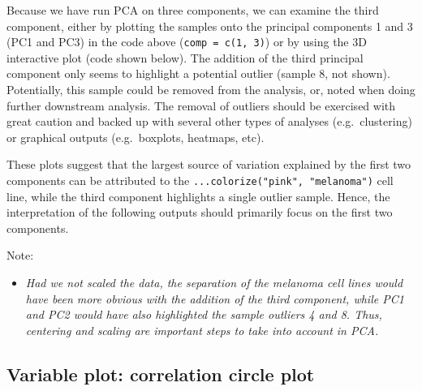 \documentclass[
]{book}
\newenvironment{Shaded}{\begin{snugshade}}{\end{snugshade}}
\newcommand{\AttributeTok}[1]{\textcolor[rgb]{0.77,0.63,0.00}{#1}}
\newcommand{\CommentTok}[1]{\textcolor[rgb]{0.56,0.35,0.01}{\textit{#1}}}
\newcommand{\FunctionTok}[1]{\textcolor[rgb]{0.00,0.00,0.00}{#1}}
\newcommand{\NormalTok}[1]{#1}
\newcommand{\SpecialCharTok}[1]{\textcolor[rgb]{0.00,0.00,0.00}{#1}}
\newcommand{\StringTok}[1]{\textcolor[rgb]{0.31,0.60,0.02}{#1}}
\providecommand{\tightlist}{%
  \setlength{\itemsep}{0pt}\setlength{\parskip}{0pt}}
\begin{document}
Because we have run PCA on three components, we can examine the third component, either by plotting the samples onto the principal components 1 and 3 (PC1 and PC3) in the code above (\texttt{comp\ =\ c(1,\ 3)}) or by using the 3D interactive plot (code shown below). The addition of the third principal component only seems to highlight a potential outlier (sample 8, not shown). Potentially, this sample could be removed from the analysis, or, noted when doing further downstream analysis. The removal of outliers should be exercised with great caution and backed up with several other types of analyses (e.g.~clustering) or graphical outputs (e.g.~boxplots, heatmaps, etc).

\begin{Shaded}
\end{Shaded}

These plots suggest that the largest source of variation explained by the first two components can be attributed to the \texttt{...colorize("pink",\ "melanoma")} cell line, while the third component highlights a single outlier sample. Hence, the interpretation of the following outputs should primarily focus on the first two components.

Note:

\begin{itemize}
\tightlist
\item
  \emph{Had we not scaled the data, the separation of the melanoma cell lines would have been more obvious with the addition of the third component, while PC1 and PC2 would have also highlighted the sample outliers 4 and 8. Thus, centering and scaling are important steps to take into account in PCA.}
\end{itemize}

\hypertarget{03:pca-variable-plot}{%
\subsection{Variable plot: correlation circle plot}\label{03:pca-variable-plot}}
\end{document}
